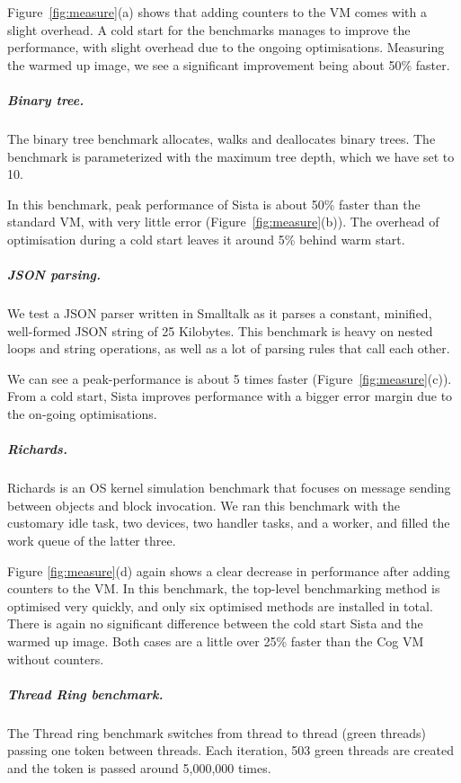\documentclass[a4paper,12pt,twoside]{../includes/ThesisStyle}
\begin{document}
Figure~\ref{fig:measure}(a) shows that adding counters to the VM comes with a slight overhead. A cold start for the benchmarks manages to improve the performance, with slight overhead due to the ongoing optimisations. Measuring the warmed up image, we see a significant improvement being about 50\% faster.                          

\subparagraph{Binary tree.}

The binary tree benchmark allocates, walks and deallocates binary trees. The benchmark is parameterized with  the maximum tree depth, which we have set to 10.

In this benchmark, peak performance of Sista is about 50\% faster than the standard VM, with very little error (Figure~\ref{fig:measure}(b)). The overhead of optimisation during a cold start leaves it around 5\% behind warm start.

\subparagraph{JSON parsing.}

We test a JSON parser written in Smalltalk as it parses a constant, minified, well-formed JSON string of 25 Kilobytes. This benchmark is heavy on nested loops and string operations, as well as a lot of parsing rules that call each other.

We can see a peak-performance is about 5 times faster (Figure~\ref{fig:measure}(c)). From a cold start, Sista improves performance with a bigger error margin due to the on-going optimisations.

\subparagraph{Richards.}

Richards is an OS kernel simulation benchmark that focuses on message sending between objects and block invocation. We ran this benchmark with the customary idle task, two devices, two handler tasks, and a worker, and filled the work queue of the latter three.

Figure \ref{fig:measure}(d) again shows a clear decrease in performance after adding counters to the VM. In this benchmark, the top-level benchmarking method is optimised very quickly, and only six optimised methods are installed in total. There is again no significant difference between the cold start Sista and the warmed up image. Both cases are a little over 25\% faster than the Cog VM without counters.

\subparagraph{Thread Ring benchmark.}

The Thread ring benchmark switches from thread to thread (green threads) passing one token between threads. Each iteration, 503 green threads are created and the token is passed around 5,000,000 times.
\end{document}
